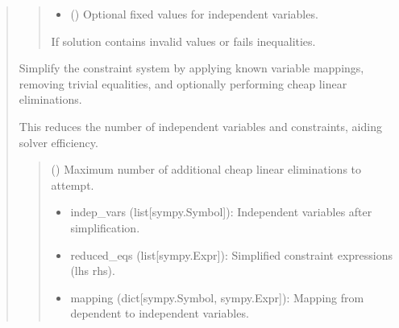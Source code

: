 \documentclass[letterpaper,10pt,english]{sphinxmanual}
\begin{document}
\begin{quote}
\begin{fulllineitems}
\begin{fulllineitems}
\begin{quote}
\begin{description}
\begin{itemize}
\item {} 
\sphinxAtStartPar
{} () \textendash{} Optional fixed values for independent variables.

\end{itemize}

\sphinxAtStartPar
{} \textendash{} If solution contains invalid values or fails inequalities.

\end{description}\end{quote}

\end{fulllineitems}


\begin{fulllineitems}
\label{\detokenize{pygeox:pygeox.solver.SolverNamespace.simplify_constraints}}
\pysigstartsignatures
\pysiglinewithargsret
{}
{}
{}
\pysigstopsignatures
\sphinxAtStartPar
Simplify the constraint system by applying known variable mappings, removing
trivial equalities, and optionally performing cheap linear eliminations.

\sphinxAtStartPar
This reduces the number of independent variables and constraints, aiding solver efficiency.
\begin{quote}\begin{description}
\sphinxAtStartPar
{} () \textendash{} Maximum number of additional cheap linear eliminations to attempt.

\sphinxAtStartPar
\begin{itemize}
\item {} 
\sphinxAtStartPar
indep\_vars (list{[}sympy.Symbol{]}): Independent variables after simplification.

\item {} 
\sphinxAtStartPar
reduced\_eqs (list{[}sympy.Expr{]}): Simplified constraint expressions (lhs \sphinxhyphen{} rhs).

\item {} 
\sphinxAtStartPar
mapping (dict{[}sympy.Symbol, sympy.Expr{]}): Mapping from dependent to independent variables.


\end{itemize}
\end{description}
\end{quote}
\end{fulllineitems}
\end{fulllineitems}
\end{quote}
\end{document}
